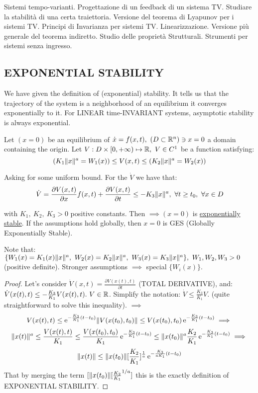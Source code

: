 Sistemi tempo-varianti. Progettazione di un feedback di un sistema TV. Studiare la stabilità di una certa traiettoria. Versione del teorema di Lyapunov per i sistemi TV. Principi di Invarianza per sistemi TV. Linearizzazione. Versione più generale del teorema indiretto. Studio delle proprietà Strutturali. Strumenti per sistemi senza ingresso.

\subsection{EXPONENTIAL STABILITY}

We have given the definition of (exponential) stability. It tells us that the trajectory of the system is a neighborhood of an equilibrium it converges exponentially to it. For LINEAR time-INVARIANT systems, asymptotic stability is always exponential.

\begin{thrm}
Let $(x=0)$ be an equilibrium of $\dot{x}=f(x,t),\ (D \subset \mathbb{R}^n) \ni x=0$ a domain containing the origin. Let $V:D \times [0,+\infty) \mapsto \mathbb{R},\ V \in C^1$ be a function satisfying:
\[
	(K_1\lVert x\rVert^a = W_1(x)) \leq V(x,t) \leq (K_2\lVert x\rVert^a = W_2(x))
\]

Asking for some uniform bound. For the $\dot{V}$ we have that:
\[
	\dot{V} = \frac{\partial{V(x,t)}}{\partial{x}}f(x,t) + \frac{\partial{V(x,t)}}{\partial{t}} \leq -K_3\lVert x\rVert^a,\ \forall t \geq t_0,\ \forall x \in D
\]

with $K_1,\ K_2,\ K_3 > 0$ positive constants. Then $\implies (x=0)$ is \underline{exponentially stable}. If the assumptions hold globally, then $x=0$ is GES (Globally Exponentially Stable).
\end{thrm}

Note that: $\{W_1(x) = K_1(x)\norma{x}^a,\ W_2(x) = K_2\norma{x}^a,\ W_3(x) = K_3\norma{x}^a\},\ W_1,W_2,W_3 > 0$ (positive definite). Stronger assumptions $\implies$ special $\{W_i(x)\}$.

\begin{proof}
Let's consider $\dot{V}(x,t) = \frac{\partial{V(x(t),t)}}{\partial{t}}$ (TOTAL DERIVATIVE), and: $\dot{V}(x(t),t) \leq -\frac{K_3}{K_1}V(x(t),t).\ V \in \mathbb{R}$. Simplify the notation: $\dot{V} \leq \frac{K_3}{K_1}V$. (quite straightforward to solve this inequality). $\implies$
\[
	V(x(t),t) \leq \mathop{}\!\mathrm{e}^{-\frac{K_3}{K_1}(t-t_0)}\lVert V(x(t_0),t_0)\rVert \leq  V(x(t_0),t_0) \mathop{}\!\mathrm{e}^{-\frac{K_3}{K_1}(t-t_0)} \implies
\]
\[
	\lVert x(t)\rVert^a \leq \frac{V(x(t),t)}{K_1} \leq \frac{V(x(t_0),t_0)}{K_1} \mathop{}\!\mathrm{e}^{-\frac{K_3}{K_1}(t-t_0)} \leq \lVert x(t_0)\rVert^a \frac{K_2}{K_1} \mathop{}\!\mathrm{e}^{-\frac{K_3}{K_1}(t-t_0)} \implies
\]
\[
	\lVert x(t)\rVert \le \lVert x(t_0)\rVert[\frac{K_2}{K_1}]^{\frac{1}{a}} \mathop{}\!\mathrm{e}^{-\frac{K_3}{aK_1} (t-t_0)}
\]
That by merging the term $[\lVert x(t_0)\rVert[\frac{K_2}{K_1}^{1/a}]$ this is the exactly definition of EXPONENTIAL STABILITY.
\end{proof}

